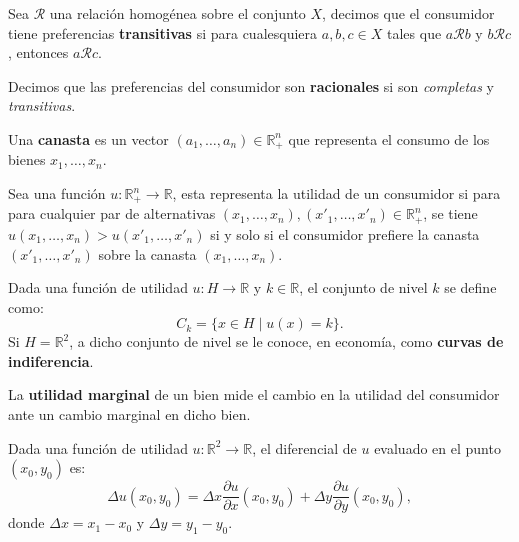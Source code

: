 \documentclass[8pt,a4paper]{extarticle}
\begin{document}
\begin{multicols}{3}
\begin{boxdef}[Transitividad]
	Sea $\mathcal{R}$ una relación homogénea sobre el conjunto $X$, decimos que el consumidor tiene preferencias \textbf{transitivas} si para cualesquiera $a, b, c \in X$ tales que $a \mathcal{R} b$ y $b \mathcal{R} c$, entonces $a \mathcal{R} c$.
\end{boxdef}

\begin{boxdef}[Racionalidad]
	Decimos que las preferencias del consumidor son \textbf{racionales} si son \emph{completas} y \emph{transitivas}.
\end{boxdef}

\begin{boxdef}[Canasta]
Una \textbf{canasta} es un vector $(a_1, \ldots, a_n) \in \mathbb{R}^n_+$ que representa el consumo de los bienes $x_1, \ldots, x_n$.
\end{boxdef}

\begin{boxdef}
	Sea una función $u : \mathbb{R}^n_+ \to \mathbb{R}$, esta representa la utilidad de un consumidor si para para cualquier par de alternativas $(x_1, \ldots, x_n), (x'_1, \ldots, x'_n) \in \mathbb{R}^n_+$, se tiene $u(x_1, \ldots, x_n) > u(x'_1, \ldots, x'_n)$ si y solo si el consumidor prefiere la canasta $(x'_1, \ldots, x'_n)$ sobre la canasta $(x_1, \ldots, x_n)$.
\end{boxdef}

\begin{boxdef}
	Dada una función de utilidad $u : H \to \mathbb{R}$ y $k \in \mathbb{R}$, el conjunto de nivel $k$ se define como:
	\[
		C_k = \{x \in H  \mid u(x) = k\}
	.\] 
Si $H = \mathbb{R}^2$, a dicho conjunto de nivel se le conoce, en economía, como \textbf{curvas de indiferencia}.
\end{boxdef}

\begin{boxdef}
	La \textbf{utilidad marginal} de un bien mide el cambio en la utilidad del consumidor ante un cambio marginal en dicho bien.
\end{boxdef}

\begin{boxtheo}
	Dada una función de utilidad $u : \mathbb{R}^2 \to \mathbb{R}$, el diferencial de $u$ evaluado en el punto $(x_0, y_0)$ es:
	\[
		\Delta u(x_0, y_0) = \Delta x \frac{\partial u}{\partial x} (x_0, y_0) + \Delta y \frac{\partial u}{\partial y} (x_0 , y_0)
	,\] donde $\Delta x = x_1 - x_0$ y $\Delta y = y_1 - y_0$.
\end{boxtheo}


\end{multicols}
\end{document}
